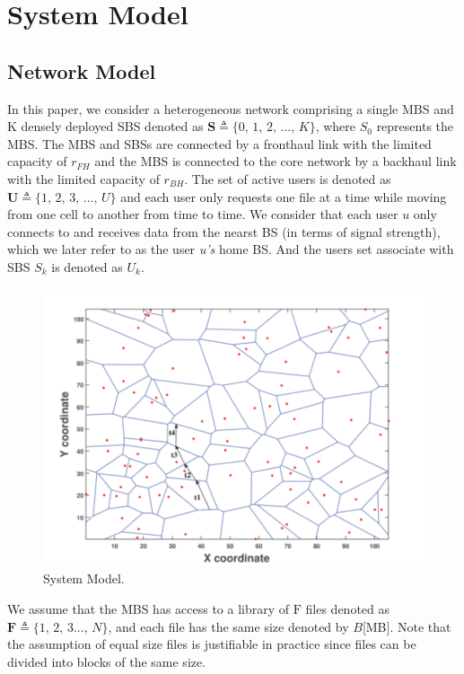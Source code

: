 \documentclass[conference]{IEEEtran}
\begin{document}
\section{System Model}
\subsection{Network Model}
In this paper, we consider a heterogeneous network comprising a single MBS and K densely deployed SBS denoted as $\mathbf{S} \triangleq\{0\mathrm{,\,}1\mathrm{,\,}2\mathrm{,\,}...\mathrm{,\,}K\}$, where $S_0$ represents the MBS. The MBS and SBSs are connected by a fronthaul link with the limited capacity of $ r_{FH}$ and the MBS is connected to the core network by a backhaul link with the limited capacity of $ r_{BH}$. The set of active users is denoted as $\mathbf{U} \triangleq\{1\mathrm{,\,}2\mathrm{,\,}3\mathrm{,\,}...\mathrm{,\,}U\}$ and each user only requests one file at a time while moving from one cell to another from time to time. We consider that each user $u$ only connects to and receives data from the nearst BS (in terms of signal strength), which we later refer to as the user \emph{u’s} home BS. And the users set associate with SBS $S_k$ is denoted as $U_k$.

\begin{figure}[htbp]
 \centerline{\includegraphics[scale=0.7]{fig1.png}}
 \caption{System Model.}
 \label{fig 1}
\end{figure}

We assume that the MBS has access to a library of $\mathrm{F}$ files denoted as $\mathbf{F} \triangleq\{1\mathrm{,\,}2\mathrm{,\,}3...\mathrm{,\,}N\}$, and each file has the same size denoted by $B$[MB]. Note that the assumption of equal size files is justifiable in practice since files can be divided into blocks of the same size.
\end{document}
